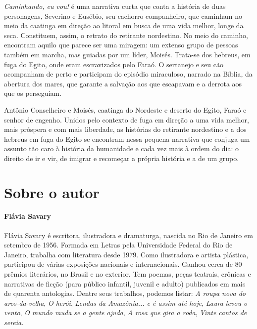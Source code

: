\documentclass[11pt]{extarticle}
\begin{document}
\textit{Caminhando, eu vou!} é uma narrativa curta que conta a história de duas personagens, Severino e Eusébio,
seu cachorro companheiro, que caminham no meio da caatinga em direção ao litoral em busca de uma vida melhor, 
longe da seca. Constituem, assim, o retrato do retirante nordestino. 
No meio do caminho, encontram aquilo que parece ser uma miragem: um extenso grupo de pessoas também em marcha,
mas guiadas por um líder, Moisés. Trata-se dos hebreus, em fuga do Egito, onde eram escravizados
pelo Faraó. O sertanejo e seu cão acompanham de perto e participam do episódio miraculoso, narrado na Bíblia,
da abertura dos mares, que garante a salvação aos que escapavam e a derrota aos que os perseguiam. 

Antônio Conselheiro e Moisés, caatinga do Nordeste e deserto do Egito, 
Faraó e senhor de engenho. Unidos pelo contexto de fuga em direção a uma vida melhor, mais próspera e com mais liberdade,
as histórias do retirante nordestino e a dos hebreus em fuga do Egito se encontram nessa pequena narrativa que
conjuga um assunto tão caro à história da humanidade e cada vez mais à ordem do dia:
o direito de ir e vir, de imigrar e recomeçar a própria história e a de um grupo. 


\section{Sobre o autor}

\paragraph{Flávia Savary}


Flávia Savary é escritora, ilustradora e dramaturga, nascida no Rio de Janeiro em setembro de 1956. 
Formada em Letras pela Universidade Federal do Rio de Janeiro, trabalha com literatura desde 1979.
Como ilustradora e artista plástica, participou de várias exposições nacionais e internacionais.
Ganhou cerca de 80 prêmios literários, no Brasil e no exterior. Tem poemas, peças teatrais, crônicas e narrativas de ficção 
(para público infantil, juvenil e adulto) publicados em mais de quarenta antologias.
Dentre seus trabalhos, podemos listar: \textit{A roupa nova do arco-da-velha}, \textit{O herói}, \textit{Lendas da Amazônia... e é assim até hoje}, \textit{Laura levou o vento}, \textit{O mundo muda se a gente ajuda}, \textit{A rosa que gira a roda},
\textit{Vinte cantos de sereia}.
\end{document}
